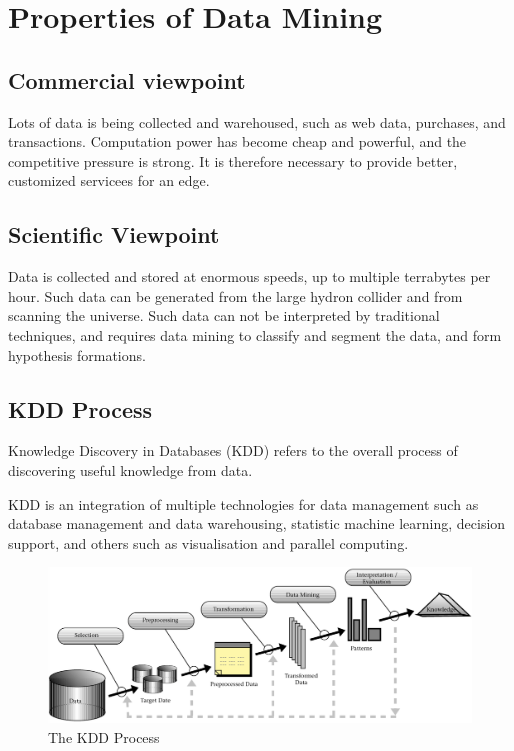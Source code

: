 \section{Properties of Data Mining}
\subsection{Commercial viewpoint}
Lots of data is being collected and warehoused, such as web data, purchases, and transactions.
Computation power has become cheap and powerful, and the competitive pressure is strong.
It is therefore necessary to provide better, customized servicees for an edge.

\subsection{Scientific Viewpoint}
Data is collected and stored at enormous speeds, up to multiple terrabytes per hour.
Such data can be generated from the large hydron collider and from scanning the universe.
Such data can not be interpreted by traditional techniques, and requires data mining to classify and segment the data,
and form hypothesis formations.

\newpage
\subsection{KDD Process}
Knowledge Discovery in Databases (KDD) refers to the overall process of discovering useful knowledge from data.

KDD is an integration of multiple technologies for data management such as database management and data warehousing, 
statistic machine learning, decision support, and others such as visualisation and parallel computing. 

\begin{figure}[H]
    \centering
    \includegraphics[scale=0.2]{figures/kdd.png}
    \caption{The KDD Process}
\end{figure}

